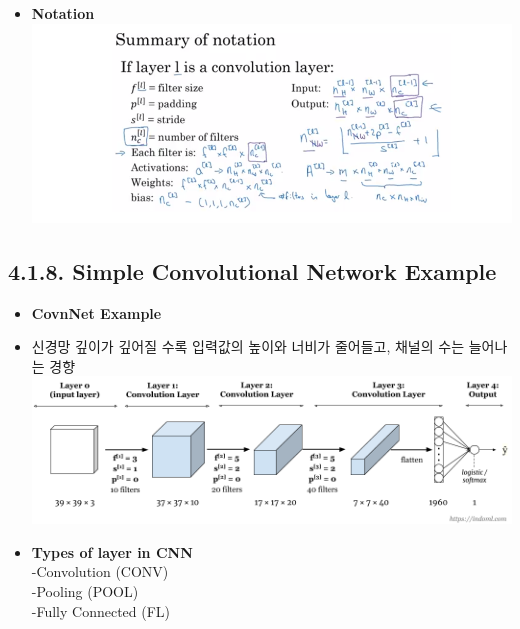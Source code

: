 \documentclass[11pt]{article}
\makeatletter
\def\maxwidth{\ifdim\Gin@nat@width>\linewidth\linewidth
    \else\Gin@nat@width\fi}
\let\Oldincludegraphics\includegraphics
\renewcommand{\includegraphics}[1]{\Oldincludegraphics[width=.8\maxwidth]{#1}}
\providecommand{\tightlist}{%
      \setlength{\itemsep}{0pt}\setlength{\parskip}{0pt}}
\makeatother
\begin{document}
\begin{itemize}
\item
  \textbf{Notation}\\
  \includegraphics{./Images/c4week1/15-4.png} 
\end{itemize}

    \subsection{4.1.8. Simple Convolutional Network
Example}\label{simple-convolutional-network-example}

\begin{itemize}
\tightlist
\item
  \textbf{CovnNet Example}\\
\item
  신경망 깊이가 깊어질 수록 입력값의 높이와 너비가 줄어들고, 채널의 수는
  늘어나는 경향 \includegraphics{./Images/c4week1/16.png} 
\item
  \textbf{Types of layer in CNN}\\
  -Convolution (CONV)\\
  -Pooling (POOL)\\
  -Fully Connected (FL)
\end{itemize}
\end{document}
